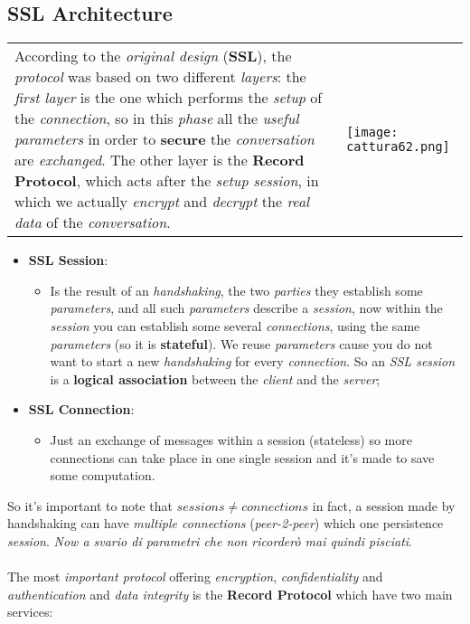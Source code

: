 \documentclass{article}
\begin{document}
\subsection{SSL Architecture}
\begin{tabular}{C{9.5cm}  L{10.5cm}}
According to the \emph{original design} (\textbf{SSL}), the \emph{protocol} was based on two different \emph{layers}: the \emph{first layer} is the one which performs the \emph{setup} of the \emph{connection}, so in this \emph{phase} all the \emph{useful parameters} in order to \textbf{secure} the \emph{conversation} are \emph{exchanged}. The other layer is the \textbf{Record Protocol}, which acts after the \emph{setup session}, in which we actually \emph{encrypt} and \emph{decrypt} the \emph{real data} of the \emph{conversation}.
& \texttt{[image: cattura62.png]}
\end{tabular}
\clearpage
\begin{itemize}
\item \textbf{SSL Session}:
\begin{itemize}
\item Is the result of an \emph{handshaking}, the two \emph{parties} they establish some \emph{parameters}, and all such \emph{parameters} describe a \emph{session}, now within the \emph{session} you can establish some several \emph{connections}, using the same \emph{parameters} (so it is \textbf{stateful}). We reuse \emph{parameters} cause you do not want to start a new \emph{handshaking} for every \emph{connection}. So an \emph{SSL session} is a \textbf{logical association} between the \emph{client} and the \emph{server};
\end{itemize}
\item \textbf{SSL Connection}:
\begin{itemize}
\item Just an exchange of messages within a session (stateless) so more connections can take place in one single session and it's made to save some computation.
\end{itemize}
\end{itemize}
So it's important to note that $sessions \neq connections$ in fact, a session made by handshaking can have \emph{multiple connections} (\emph{peer-2-peer}) which one persistence \emph{session}. \emph{Now a svario di parametri che non ricorderò mai quindi pisciati}. \\\\
The most \emph{important protocol} offering \emph{encryption}, \emph{confidentiality} and \emph{authentication} and \emph{data integrity} is the \textbf{Record Protocol} which have two main services: 
\end{document}
